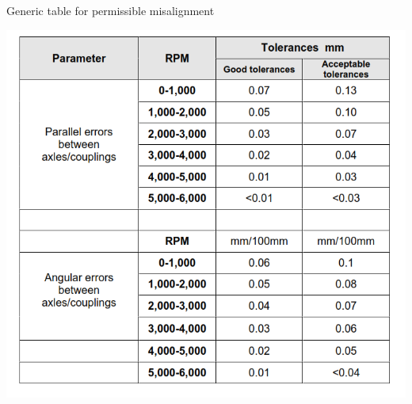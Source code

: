 \begin{table}
	\caption{Generic table for permissible misalignment}
	\label{ch04_tbl_ch04_11_fot_eccentric_reducer}
	\includegraphics[scale=0.4]{tables/ch04_21_generic_tolerance_table}
	
\end{table}



